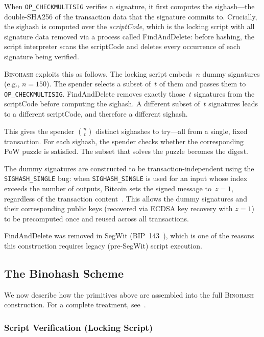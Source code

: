 \documentclass[11pt, a4paper]{article}
\begin{document}
When \texttt{OP\_CHECKMULTISIG} verifies a signature, it first computes the sighash---the double-SHA256 of the transaction data that the signature commits to. Crucially, the sighash is computed over the \emph{scriptCode}, which is the locking script with all signature data removed via a process called FindAndDelete: before hashing, the script interpreter scans the scriptCode and deletes every occurrence of each signature being verified.

\textsc{Binohash} exploits this as follows. The locking script embeds~$n$ dummy signatures (e.g., $n = 150$). The spender selects a subset of~$t$ of them and passes them to \texttt{OP\_CHECKMULTISIG}. FindAndDelete removes exactly those~$t$ signatures from the scriptCode before computing the sighash. A different subset of~$t$ signatures leads to a different scriptCode, and therefore a different sighash.

This gives the spender $\binom{n}{t}$ distinct sighashes to try---all from a single, fixed transaction. For each sighash, the spender checks whether the corresponding PoW puzzle is satisfied. The subset that solves the puzzle becomes the digest.

The dummy signatures are constructed to be transaction-independent using the \texttt{SIGHASH\_SINGLE} bug: when \texttt{SIGHASH\_SINGLE} is used for an input whose index exceeds the number of outputs, Bitcoin sets the signed message to~$z = 1$, regardless of the transaction content~\cite{linus2024binohash}. This allows the dummy signatures and their corresponding public keys (recovered via ECDSA key recovery with $z = 1$) to be precomputed once and reused across all transactions.

\noindent FindAndDelete was removed in SegWit (BIP~143~\cite{bip143}), which is one of the reasons this construction requires legacy (pre-SegWit) script execution.

\subsection{The Binohash Scheme}
\label{sec:binohash-scheme}

We now describe how the primitives above are assembled into the full \textsc{Binohash} construction. For a complete treatment, see~\cite{linus2024binohash}.

\subsubsection{Script Verification (Locking Script)}
\end{document}
